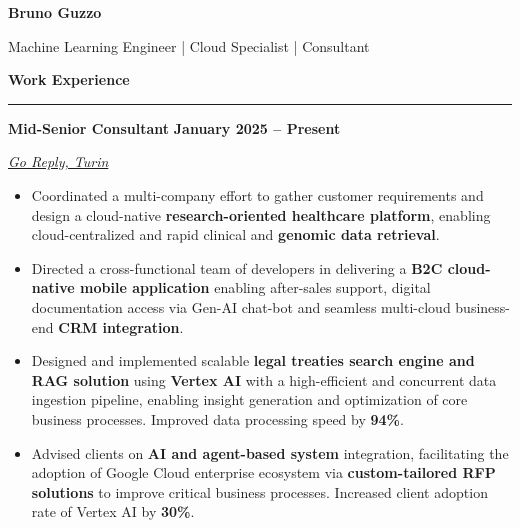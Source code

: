 \documentclass[9pt, a4paper]{article}
\newcommand{\cvsection}[1]{%
	\vspace{2pt}\par
	{\Large\bfseries\color{sectionblue}#1}\par
	\vspace{2pt}\hrule\vspace{6pt}
}
\newcommand{\cvsubsection}[3]{%
	\par {\large\bfseries #1} \hfill {\bfseries #2} \par {\textit{#3}} \vspace{4pt}
}
\begin{document}
	
	\begin{center}
		{\Huge\bfseries Bruno Guzzo}\par
		\vspace{4pt}
		{\Large Machine Learning Engineer | Cloud Specialist | Consultant}
	\end{center}
	
	\begin{minipage}[t]{0.65\linewidth}
		\vspace{0pt} %
		
		\cvsection{Work Experience}
		
		\cvsubsection{Mid-Senior Consultant}{January 2025 -- Present}{\href{https://www.reply.com/go-reply/en}{Go Reply, Turin}}
		
		\begin{itemize}[leftmargin=*, nosep]
			\item \footnotesize Coordinated a multi-company effort to gather customer requirements and design a cloud-native \textbf{research-oriented healthcare platform}, enabling cloud-centralized and rapid clinical and \textbf{genomic data retrieval}.     
			
			\vspace{2pt}
			\item \footnotesize Directed a cross-functional team of developers in delivering a \textbf{B2C cloud-native mobile application} enabling after-sales support, digital documentation access via Gen-AI chat-bot and seamless multi-cloud business-end \textbf{CRM integration}.   
			
			\vspace{2pt}
			\item \footnotesize Designed and implemented scalable \textbf{legal treaties search engine and RAG solution} using \textbf{Vertex AI} with a high-efficient and concurrent data ingestion pipeline, enabling insight generation and optimization of core business processes. 
			Improved data processing speed by \textbf{94\%}.  
			
			\vspace{2pt}		
			\item \footnotesize Advised clients on \textbf{AI and agent-based system} integration, facilitating the adoption of Google Cloud enterprise ecosystem via \textbf{custom-tailored RFP solutions} to improve critical business processes.
			Increased client adoption rate of Vertex AI by \textbf{30\%}.  
			

\end{itemize}
\end{minipage}
\end{document}

